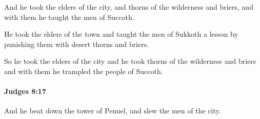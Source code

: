 			\begin{versebox}
					\item[BHS] 
					\item[ASV] And he took the elders of the city, and thorns of the wilderness and briers, and with them he taught the men of Succoth.
					\item[NIV] He took the elders of the town and taught the men of Sukkoth a lesson by punishing them with desert thorns and briers.
					\item[NRSV] So he took the elders of the city and he took thorns of the wilderness and briers and with them he trampled the people of Succoth.
			\end{versebox}

		\paragraph{Judges 8:17} %
			\label{JUDGES-8-17}

			And he beat down the tower of Penuel, and slew the men of the city.

